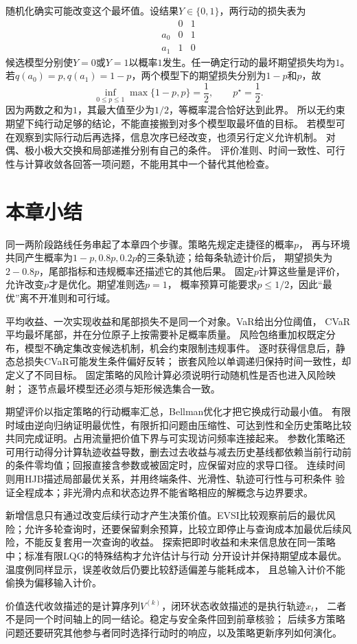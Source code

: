 随机化确实可能改变这个最坏值。设结果$Y\in\{0,1\}$，两行动的损失表为
\[
  \begin{array}{c|cc}
    &0&1\\ \hline
    a_0&0&1\\
    a_1&1&0
  \end{array}
\]
候选模型分别使$Y=0$或$Y=1$以概率$1$发生。任一确定行动的最坏期望损失均为$1$。
若$q(a_0)=p,q(a_1)=1-p$，两个模型下的期望损失分别为$1-p$和$p$，故
\[
  \inf_{0\leq p\leq1}\max\{1-p,p\}=\frac12,
  \qquad p^\star=\frac12.
\]
因为两数之和为$1$，其最大值至少为$1/2$，等概率混合恰好达到此界。
所以无约束期望下纯行动足够的结论，不能直接搬到对多个模型取最坏值的目标。
若模型可在观察到实际行动后再选择，信息次序已经改变，也须另行定义允许机制。
对偶、极小极大交换和局部递推分别有自己的条件。
评价准则、时间一致性、可行性与计算收敛各回答一项问题，不能用其中一个替代其他检查。

\section{本章小结}
\label{sec:decision-theory-and-dynamic-risk-summary}

同一两阶段路线任务串起了本章四个步骤。策略先规定走捷径的概率$p$，
再与环境共同产生概率为$1-p,0.8p,0.2p$的三条轨迹；给每条轨迹计价后，
期望损失为$2-0.8p$，尾部指标和违规概率还描述它的其他后果。
固定$p$计算这些量是评价，允许改变$p$才是优化。期望准则选$p=1$，
概率预算可能要求$p\leq1/2$，因此“最优”离不开准则和可行域。

平均收益、一次实现收益和尾部损失不是同一个对象。VaR给出分位阈值，
CVaR平均最坏尾部，并在分位原子上按需要补足概率质量。
风险包络重加权既定分布，模型不确定集改变候选机制，机会约束限制违规事件。
逐时获得信息后，静态总损失CVaR可能发生条件偏好反转；
嵌套风险以单调递归保持时间一致性，却定义了不同目标。
固定策略的风险计算必须说明行动随机性是否也进入风险映射；
逐节点最坏模型还必须与矩形候选集合一致。

期望评价以指定策略的行动概率汇总，Bellman优化才把它换成行动最小值。
有限时域由逆向归纳证明最优性，有限折扣问题由压缩性、可达到性和全历史策略比较
共同完成证明。占用流量把价值下界与可实现访问频率连接起来。
参数化策略还可用行动得分计算轨迹收益导数，删去过去收益与减去历史基线都依赖当前行动前的条件零均值；回报直接含参数或被固定时，应保留对应的求导口径。
连续时间则用HJB描述局部最优关系，并用终端条件、光滑性、轨迹可行性与可积条件
验证全程成本；非光滑内点和状态边界不能省略相应的解概念与边界要求。

新增信息只有通过改变后续行动才产生决策价值。EVSI比较观察前后的最优风险；允许多轮查询时，还要保留剩余预算，比较立即停止与查询成本加最优后续风险，不能反复套用一次查询的收益。
探索把即时收益和未来信息放在同一策略中；标准有限LQG的特殊结构才允许估计与行动
分开设计并保持期望成本最优。温度例同样显示，误差收敛后仍要比较舒适偏差与能耗成本，
且总输入计价不能偷换为偏移输入计价。

价值迭代收敛描述的是计算序列$V^{(k)}$，闭环状态收敛描述的是执行轨迹$x_t$，
二者不是同一个时间轴上的同一结论。稳定与安全条件回到前章核验；
后续多方策略问题还要研究其他参与者同时选择行动时的响应，以及策略更新序列如何演化。
